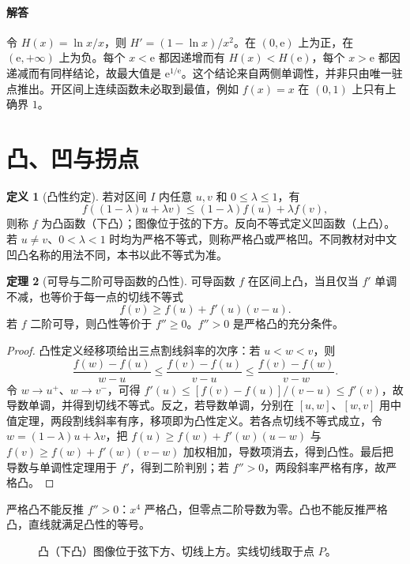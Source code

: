 \documentclass[UTF8,fontset=fandol,12pt,oneside,openany]{ctexrep}
\newcommand{\ee}{\mathrm e}
\theoremstyle{definition}
\newtheorem{theorem}{定理}[chapter]
\newtheorem{definition}[theorem]{定义}
\begin{document}
\paragraph{解答}令 $H(x)=\ln x/x$，则 $H'=(1-\ln x)/x^2$。在 $(0,\ee)$ 上为正，在 $(\ee,+\infty)$ 上为负。每个 $x<\ee$ 都因递增而有 $H(x)<H(\ee)$，每个 $x>\ee$ 都因递减而有同样结论，故最大值是 $\ee^{1/\ee}$。这个结论来自两侧单调性，并非只由唯一驻点推出。开区间上连续函数未必取到最值，例如 $f(x)=x$ 在 $(0,1)$ 上只有上确界 $1$。

\section{凸、凹与拐点}
\label{lec:09:convexity}
\begin{definition}[凸性约定]
若对区间 $I$ 内任意 $u,v$ 和 $0\le\lambda\le1$，有
\[ f((1-\lambda)u+\lambda v)\le(1-\lambda)f(u)+\lambda f(v), \]
则称 $f$ 为凸函数（下凸）；图像位于弦的下方。反向不等式定义凹函数（上凸）。若 $u\ne v$、$0<\lambda<1$ 时均为严格不等式，则称严格凸或严格凹。不同教材对中文凹凸名称的用法不同，本书以此不等式为准。
\end{definition}
\begin{theorem}[可导与二阶可导函数的凸性]
可导函数 $f$ 在区间上凸，当且仅当 $f'$ 单调不减，也等价于每一点的切线不等式
\[ f(v)\ge f(u)+f'(u)(v-u). \]
若 $f$ 二阶可导，则凸性等价于 $f''\ge0$。$f''>0$ 是严格凸的充分条件。
\end{theorem}
\begin{proof}
凸性定义经移项给出三点割线斜率的次序：若 $u<w<v$，则
\[\frac{f(w)-f(u)}{w-u}\le\frac{f(v)-f(u)}{v-u}\le\frac{f(v)-f(w)}{v-w}.\]
令 $w\to u^+$、$w\to v^-$，可得 $f'(u)\le[f(v)-f(u)]/(v-u)\le f'(v)$，故导数单调，并得到切线不等式。反之，若导数单调，分别在 $[u,w]$、$[w,v]$ 用中值定理，两段割线斜率有序，移项即为凸性定义。若各点切线不等式成立，令 $w=(1-\lambda)u+\lambda v$，把 $f(u)\ge f(w)+f'(w)(u-w)$ 与 $f(v)\ge f(w)+f'(w)(v-w)$ 加权相加，导数项消去，得到凸性。最后把导数与单调性定理用于 $f'$，得到二阶判别；若 $f''>0$，两段斜率严格有序，故严格凸。
\end{proof}
严格凸不能反推 $f''>0$：$x^4$ 严格凸，但零点二阶导数为零。凸也不能反推严格凸，直线就满足凸性的等号。

\begin{figure}[htbp]
\centering
{}
\caption{凸（下凸）图像位于弦下方、切线上方。实线切线取于点 $P$。}
\end{figure}
\end{document}
